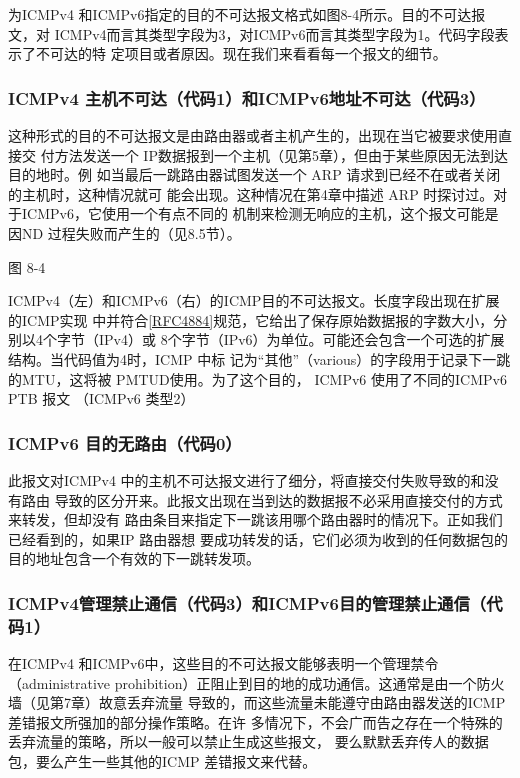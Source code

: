 为ICMPv4 和ICMPv6指定的目的不可达报文格式如图8-4所示。目的不可达报文，对
ICMPv4而言其类型字段为3，对ICMPv6而言其类型字段为1。代码字段表示了不可达的特
定项目或者原因。现在我们来看看每一个报文的细节。

\subsubsection{ICMPv4 主机不可达（代码1）和ICMPv6地址不可达（代码3）}
这种形式的目的不可达报文是由路由器或者主机产生的，出现在当它被要求使用直接交
付方法发送一个 IP数据报到一个主机（见第5章），但由于某些原因无法到达目的地时。例
如当最后一跳路由器试图发送一个 ARP 请求到已经不在或者关闭的主机时，这种情况就可
能会出现。这种情况在第4章中描述 ARP 时探讨过。对于ICMPv6，它使用一个有点不同的
机制来检测无响应的主机，这个报文可能是因ND 过程失败而产生的（见8.5节）。

图 8-4

ICMPv4（左）和ICMPv6（右）的ICMP目的不可达报文。长度字段出现在扩展的ICMP实现
中并符合\href{https://www.rfc-editor.org/rfc/rfc4884}{[RFC4884]}规范，它给出了保存原始数据报的字数大小，分别以4个字节（IPv4）或
8个字节（IPv6）为单位。可能还会包含一个可选的扩展结构。当代码值为4时，ICMP 中标
记为“其他”（various）的字段用于记录下一跳的MTU，这将被 PMTUD使用。为了这个目的，
ICMPv6 使用了不同的ICMPv6 PTB 报文 （ICMPv6 类型2）

\subsubsection{ICMPv6 目的无路由（代码0）}
此报文对ICMPv4 中的主机不可达报文进行了细分，将直接交付失败导致的和没有路由
导致的区分开来。此报文出现在当到达的数据报不必采用直接交付的方式来转发，但却没有
路由条目来指定下一跳该用哪个路由器时的情况下。正如我们已经看到的，如果IP 路由器想
要成功转发的话，它们必须为收到的任何数据包的目的地址包含一个有效的下一跳转发项。

\subsubsection{ICMPv4管理禁止通信（代码3）和ICMPv6目的管理禁止通信（代码1）}
在ICMPv4 和ICMPv6中，这些目的不可达报文能够表明一个管理禁令（administrative
prohibition）正阻止到目的地的成功通信。这通常是由一个防火墙（见第7章）故意丢弃流量
导致的，而这些流量未能遵守由路由器发送的ICMP差错报文所强加的部分操作策略。在许
多情况下，不会广而告之存在一个特殊的丢弃流量的策略，所以一般可以禁止生成这些报文，
要么默默丢弃传人的数据包，要么产生一些其他的ICMP 差错报文来代替。

